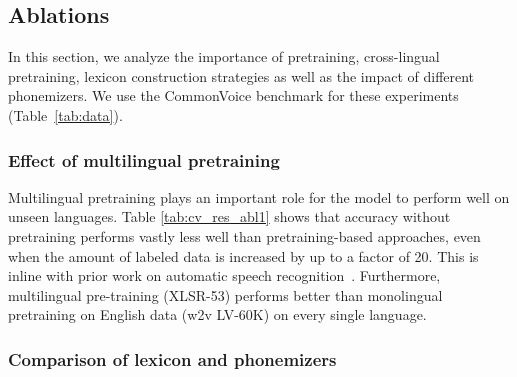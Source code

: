 \documentclass{article}
\newcommand{\ma}[1]{{\color{orange}#1}}
\begin{document}
\subsection{Ablations}


In this section, we analyze the importance of pretraining, cross-lingual pretraining, lexicon construction strategies as well as the impact of different phonemizers. 
We use the CommonVoice benchmark for these experiments (Table~\ref{tab:data}).



\subsubsection{Effect of multilingual pretraining}


Multilingual pretraining plays an important role for the model to perform well on unseen languages.
Table \ref{tab:cv_res_abl1} shows that accuracy without pretraining performs vastly less well than pretraining-based approaches, even when the amount of labeled data is increased by up to a factor of 20.
This is inline with prior work on automatic speech recognition~\cite{baevski2020wav2vec}.
Furthermore, multilingual pre-training (XLSR-53) performs better than monolingual pretraining on English data (w2v LV-60K) on every single language.


\subsubsection{Comparison of lexicon and phonemizers}
\label{sec:exp_lexicons}
\end{document}
